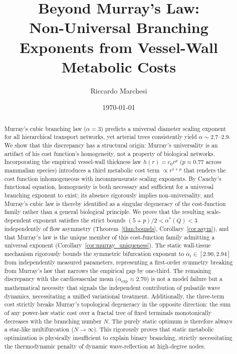 \documentclass[11pt,a4paper]{article}
\theoremstyle{remark}
\begin{document}


\title{\LARGE\bfseries Beyond Murray's Law: \\[4pt] 
Non-Universal Branching Exponents from Vessel-Wall Metabolic Costs}

\author{Riccardo Marchesi}
\date{\today}

\maketitle

\begin{abstract}
Murray's cubic branching law ($\alpha=3$) predicts a universal diameter scaling
exponent for all hierarchical transport networks, yet arterial trees
consistently yield $\alpha \sim 2.7$--$2.9$. We show that this discrepancy
has a structural origin: Murray's universality is an artifact of his cost
function's homogeneity, not a property of biological networks. Incorporating
the empirical vessel-wall thickness law $h(r)=c_0 r^p$ ($p \approx 0.77$
across mammalian species) introduces a third metabolic cost term
$\propto r^{1+p}$ that renders the cost function inhomogeneous with
incommensurate scaling exponents. By Cauchy's functional equation, homogeneity
is both necessary and sufficient for a universal branching exponent to exist;
its absence rigorously implies non-universality, and Murray's cubic law is
thereby identified as a singular degeneracy of the cost-function family rather
than a general biological principle. We prove that the resulting
scale-dependent exponent satisfies the strict bounds $(5+p)/2 < \alpha^*(Q) < 3$
independently of flow asymmetry (Theorem~\ref{thm:bounds},
Corollary~\ref{cor:asym}), and that Murray's law is the unique member of this
cost-function family admitting a universal exponent
(Corollary~\ref{cor:murray_uniqueness}). The static wall-tissue mechanism
rigorously bounds the symmetric bifurcation exponent to
$\alpha_t \in [2.90, 2.94]$ from independently measured parameters, representing
a first-order symmetry breaking from Murray's law that narrows the empirical
gap by one-third. The remaining discrepancy with the cardiovascular mean
($\alpha_{\mathrm{exp}} \approx 2.70$) is not a model failure but a
mathematical necessity that signals the independent contribution of pulsatile
wave dynamics, necessitating a unified variational treatment. Additionally,
the three-term cost strictly breaks Murray's topological degeneracy in the
opposite direction: the sum of any power-law static cost over a fractal tree
of fixed terminals monotonically decreases with the branching number $N$. The
purely static optimum is therefore always a star-like multifurcation
($N \to \infty$). This rigorously proves that static metabolic optimization is
physically insufficient to explain binary branching, strictly necessitating
the thermodynamic penalty of dynamic wave-reflection at high-degree nodes.
\end{abstract}
\end{document}
